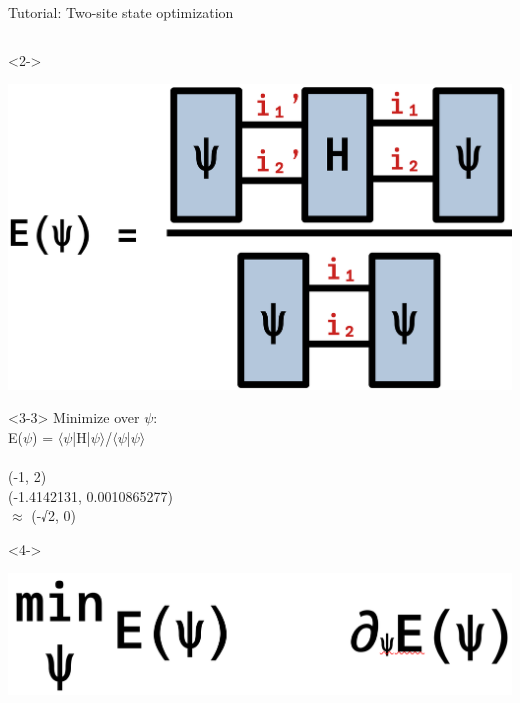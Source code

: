 \begin{frame}[fragile]{Tutorial: Two-site state optimization}
\begin{columns}
\begin{column}{5cm}
\begin{onlyenv}<2->
\vspace*{0.0cm}
\begin{center}
\includegraphics[width=1.0\textwidth]{
  slides/assets/psi12Hpsi12.png
}
\end{center}
\vspace*{0.0cm}
\end{onlyenv}

\begin{onlyenv}<3-3>
Minimize over $\psi$: \\
E($\psi$) = $\langle\psi$|H|$\psi\rangle$/$\langle\psi$|$\psi\rangle$ \\
~\\
(-1, 2) \\
(-1.4142131, 0.0010865277) \\
       $\approx$ (-√2, 0)
\end{onlyenv}

\begin{onlyenv}<4->
\vspace*{0.0cm}
\begin{center}
\includegraphics[width=1.0\textwidth]{
  slides/assets/min_grad_E_psi.png
}
\end{center}
\vspace*{0.0cm}
\end{onlyenv}

\end{column}

\end{columns}

\end{frame}
